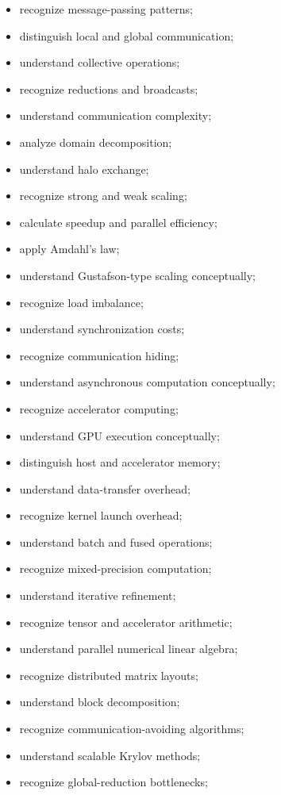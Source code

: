 {\begin{itemize}
    \item recognize message-passing patterns;
    \item distinguish local and global communication;
    \item understand collective operations;
    \item recognize reductions and broadcasts;
    \item understand communication complexity;
    \item analyze domain decomposition;
    \item understand halo exchange;
    \item recognize strong and weak scaling;
    \item calculate speedup and parallel efficiency;
    \item apply Amdahl's law;
    \item understand Gustafson-type scaling conceptually;
    \item recognize load imbalance;
    \item understand synchronization costs;
    \item recognize communication hiding;
    \item understand asynchronous computation conceptually;
    \item recognize accelerator computing;
    \item understand GPU execution conceptually;
    \item distinguish host and accelerator memory;
    \item understand data-transfer overhead;
    \item recognize kernel launch overhead;
    \item understand batch and fused operations;
    \item recognize mixed-precision computation;
    \item understand iterative refinement;
    \item recognize tensor and accelerator arithmetic;
    \item understand parallel numerical linear algebra;
    \item recognize distributed matrix layouts;
    \item understand block decomposition;
    \item recognize communication-avoiding algorithms;
    \item understand scalable Krylov methods;
    \item recognize global-reduction bottlenecks;

\end{itemize}}
